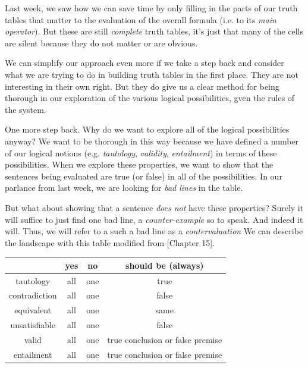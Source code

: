 
Last week, we saw how we can save time by only filling in the parts of our
truth tables that matter to the evaluation of the overall formula (i.e.
to its \emph{main operator}). But these are still \emph{complete} truth tables,
it's just that many of the cells are silent because they do not matter or are
obvious.

We can simplify our approach even more if we take a step back and consider what
we are trying to do in building truth tables in the first place. They are not
interesting in their own right. But they do give us a clear method for being
thorough in our exploration of the various logical possibilities, gven the rules
of the system.

One more step back. Why do we want to explore all of the logical possibilities
anyway? We want to be thorough in this way because we have defined a number of
our logical notions (e.g. \emph{tautology}, \emph{validity}, \emph{entailment})
in terms of these possibilities. When we explore these properties, we want to
show that the sentences being evaluated are true (or false) in all of the
possibilities. In our parlance from last week, we are looking for \emph{bad
lines} in the table.

But what about showing that a sentence \emph{does not} have these properties?
Surely it will suffice to just find one bad line, a \emph{counter-example} so
to speak. And indeed it will. Thus, we will refer to a such a bad line as a
\emph{contervaluation} We can describe the landscape with this table modified
from \cite{Mag25}[Chapter 15].

\begin{center}
  \begin{tabular}{|c|c|c|c|}
    \hline
                  & \bf{yes} & \bf{no} & should be (always)     \\
    \hline
    tautology     &  all     &  one    & true                   \\
    contradiction &  all     &  one    & false                  \\
    \hline
    equivalent    &  all     &  one    & same                   \\
    unsatisfiable &  all     &  one    & false                  \\
    \hline
    valid         &  all     &  one    & true conclusion or false premise  \\
    entailment    &  all     &  one    & true conclusion or false premise  \\
    \hline
  \end{tabular}
\end{center}

